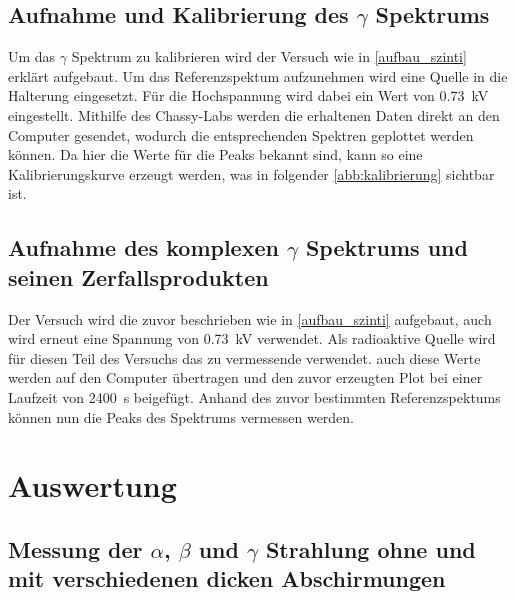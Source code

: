 \documentclass[12pt,english,ngerman]{scrartcl}
\begin{document}
\subsection{Aufnahme und Kalibrierung des \texorpdfstring{$\gamma$}{gamma} Spektrums}

Um das $\gamma$ Spektrum zu kalibrieren wird der Versuch wie in
\autoref{aufbau_szinti} erklärt aufgebaut. Um das Referenzspektum aufzunehmen
wird eine  Quelle in die Halterung eingesetzt. Für die
Hochspannung wird dabei ein Wert von \SI{0.73}{\kilo\volt} eingestellt.
Mithilfe des Chassy-Labs werden die erhaltenen Daten direkt an den Computer
gesendet, wodurch die entsprechenden Spektren geplottet werden können. Da hier
die Werte für die Peaks bekannt sind, kann so eine Kalibrierungskurve erzeugt
werden, was in folgender \autoref{abb:kalibrierung} sichtbar ist.



\subsection{Aufnahme des komplexen \texorpdfstring{$\gamma$}{gamma} Spektrums und seinen Zerfallsprodukten}

Der Versuch wird die zuvor beschrieben wie in \autoref{aufbau_szinti}
aufgebaut, auch wird erneut eine Spannung von \SI{0.73}{\kilo\volt} verwendet.
Als radioaktive Quelle wird für diesen Teil des Versuchs das zu vermessende
 verwendet. auch diese Werte werden auf den Computer
übertragen und den zuvor erzeugten Plot bei einer Laufzeit von
\SI{2400}{\second} beigefügt. Anhand des zuvor bestimmten Referenzspektums
können nun die Peaks des  Spektrums vermessen werden.





\section{Auswertung}\label{sec:Auswertung}

\subsection{Messung der \texorpdfstring{$\alpha$}{alpha}, \texorpdfstring{$\beta$}{beta} und \texorpdfstring{$\gamma$}{gamma} Strahlung ohne und mit verschiedenen dicken Abschirmungen}
\end{document}
